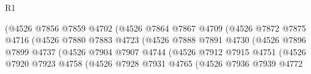\begin{lexlean}{R1}
\begin{coremodule}
                                          (@4526
                                            @7856
                                            @7859
                                            @4702
                                            (@4526
                                              @7864
                                              @7867
                                              @4709
                                              (@4526
                                                @7872
                                                @7875
                                                @4716
                                                (@4526
                                                  @7880
                                                  @7883
                                                  @4723
                                                  (@4526
                                                    @7888
                                                    @7891
                                                    @4730
                                                    (@4526
                                                      @7896
                                                      @7899
                                                      @4737
                                                      (@4526
                                                        @7904
                                                        @7907
                                                        @4744
                                                        (@4526
                                                          @7912
                                                          @7915
                                                          @4751
                                                          (@4526
                                                            @7920
                                                            @7923
                                                            @4758
                                                            (@4526
                                                              @7928
                                                              @7931
                                                              @4765
                                                              (@4526
                                                                @7936
                                                                @7939
                                                                @4772

\end{coremodule}
\end{lexlean}
